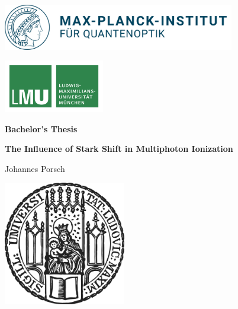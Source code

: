 \begin{titlepage}


    \centering
    
    \begin{minipage}{0.5\textwidth}
        \includegraphics[height=2cm]{figures/mpq.png}
    \end{minipage}
    \hfill
    \begin{minipage}{0.3\textwidth}
        \includegraphics[height=2.3cm]{figures/lmu-logo.pdf}
    \end{minipage}

    
    \vspace{1.7cm}

    {\Large \bfseries Bachelor's Thesis}

    \vspace{0.5cm}
    
    {\huge\bfseries The Influence of Stark Shift in Multiphoton Ionization\\[0.4cm]}
    
    \vspace{0.7cm}
    
    {\Large Johannes Porsch}
    
    \vspace{0.8cm}
    
    \vfill
    
    \includegraphics[width = 0.4\textwidth]{figures/sigillum.png}


\end{titlepage}
